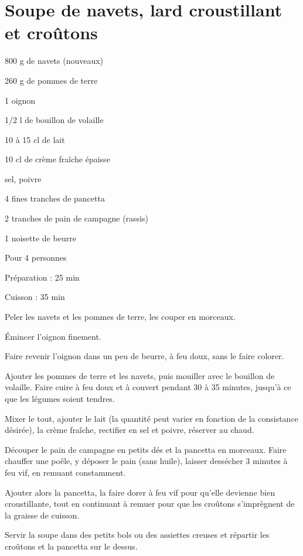 \section[\normalsize{Soupe de navets, lard croustillant et croûtons}]{Soupe de navets, lard croustillant et croûtons}

\begin{ingredients}
\item 800 g de navets (nouveaux)
\item 260 g de pommes de terre
\item 1 oignon
\item 1/2 l de bouillon de volaille
\item 10 \`a 15 cl de lait
\item 10 cl de cr\`eme fra\^iche \'epaisse
\item sel, poivre
\item 4 fines tranches de pancetta
\item 2 tranches de pain de campagne (rassis)
\item 1 noisette de beurre
\end{ingredients}
\begin{infos}
\item Pour 4 personnes
\item Préparation : 25 min
\item Cuisson : 35 min
\end{infos}
\begin{etapes}
\item Peler les navets et les pommes de terre, les couper en morceaux. 
\item Émincer l'oignon finement. 
\item Faire revenir l'oignon dans un peu de beurre, \`a feu doux, sans le faire colorer.
\item Ajouter les pommes de terre et les navets, puis mouiller avec le bouillon de volaille. Faire cuire \`a feu doux et \`a couvert pendant 30 \`a 35 minutes, jusqu'\`a ce que les l\'egumes soient tendres.
\item Mixer le tout, ajouter le lait (la quantit\'e peut varier en fonction de la consistance d\'esir\'ee), la cr\`eme fra\^iche, rectifier en sel et poivre, r\'eserver au chaud.
\item D\'ecouper le pain de campagne en petits d\'es et la pancetta en morceaux. Faire chauffer une po\^ele, y d\'eposer le pain (sans huile), laisser dess\'echer 3 minutes \`a feu vif, en remuant constamment. 
\item Ajouter alors la pancetta, la faire dorer \`a feu vif pour qu'elle devienne bien croustillante, tout en continuant \`a remuer pour que les croûtons s'impr\`egnent de la graisse de cuisson.
\item Servir la soupe dans des petits bols ou des assiettes creuses et r\'epartir les croûtons et la pancetta sur le dessus.
\end{etapes}
\begin{conseils}
\end{conseils}

